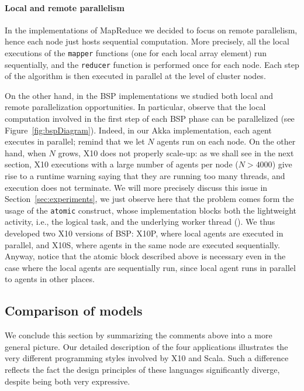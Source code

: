 \documentclass[a4paper]{article}
\numberwithin{equation}{section}
\begin{document}
\paragraph{Local and remote parallelism}
In the implementations of MapReduce we decided to focus on remote
parallelism, hence each node just hosts sequential computation. 
More precisely, all the local executions of
the \verb+mapper+ functions (one for each local array element) run
sequentially, and the \verb+reducer+ function is performed once for
each node. Each step of the algorithm is then executed in parallel at
the level of cluster nodes.
 
On the other hand, in the BSP implementations we studied
both local and remote parallelization opportunities. In particular,
observe that the local 
computation involved in the first step of each BSP phase can be
parallelized (see Figure~\ref{fig:bspDiagram}). Indeed, in our Akka
implementation, each agent executes in parallel;
remind that we let $N$ agents run on each node.
On the other hand, when $N$ grows, X10 does not properly scale-up:
as we shall see in the next section, X10 executions with
a large number of agents per node ($N\!>\!4000$) give rise to a
runtime warning saying that 
they are running too many threads, and execution does not terminate. 
We will more precisely discuss this issue in
Section~\ref{sec:experiments}, we just observe here that the problem
comes form the usage of the {\tt atomic} construct, whose
implementation blocks both the lightweight
activity, i.e., the logical task, and the underlying worker thread
(\cite{X10-Brief}).
We thus developed two X10 versions of BSP:
X10P, where local agents are executed in parallel,
and X10S, where agents in the same node are executed sequentially.
Anyway, notice that the atomic block described above is necessary even
in the case where the local agents are sequentially run,  
since local agent runs in parallel to agents in other places.  




\subsection{Comparison of models}


We conclude this section by summarizing the comments above 
into a more general picture. 
Our detailed description of the four applications illustrates the very
different programming styles involved by X10 and Scala. 
Such a difference reflects the fact the design principles of these
languages significantly diverge, despite being both very expressive.
\end{document}
